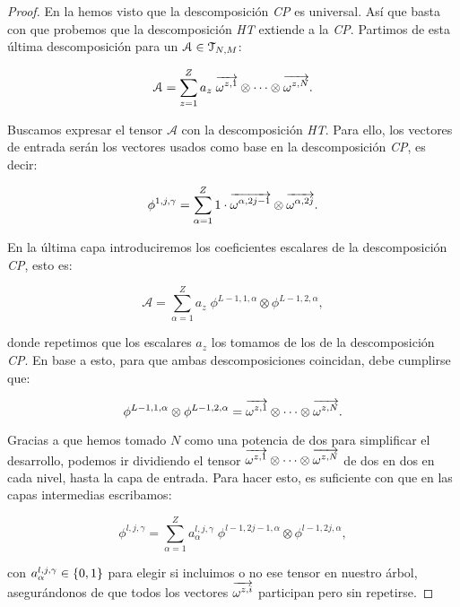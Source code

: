 \begin{proof}
    En la  hemos visto que la descomposición \textit{CP} es universal. Así que basta con que probemos que la descomposición \textit{HT} extiende a la \textit{CP}. Partimos de esta última descomposición para un $\mathcal{A} \in \mathcal{T}_{N, M}$:

    \begin{equation}
        \mathcal{A} = \sum_{z = 1}^{Z} a_z \; \overrightarrow{\omega^{z, 1}} \otimes \cdots \otimes \overrightarrow{\omega^{z, N}}.
    \end{equation}

    Buscamos expresar el tensor $\mathcal{A}$ con la descomposición \textit{HT}. Para ello, los vectores de entrada serán los vectores usados como base en la descomposición \textit{CP}, es decir:

    \begin{equation}
        \phi^{1, j, \gamma} = \sum_{\alpha = 1}^Z 1 \cdot \overrightarrow{\omega^{\alpha, 2j-1}} \otimes \overrightarrow{\omega^{\alpha, 2j}}.
    \end{equation}

    En la última capa introduciremos los coeficientes escalares de la descomposición \textit{CP}, esto es:

    \begin{equation}
        \mathcal{A} = \sum_{\alpha = 1}^Z a_z \; \phi^{L-1, 1, \alpha} \otimes \phi^{L-1, 2, \alpha},
    \end{equation}

    donde repetimos que los escalares $a_z$ los tomamos de los de la descomposición \textit{CP}. En base a esto, para que ambas descomposiciones coincidan, debe cumplirse que:

    \begin{equation}
        \phi^{L-1, 1, \alpha} \otimes \phi^{L-1, 2, \alpha} = \overrightarrow{\omega^{z,1}} \otimes \cdots \otimes \overrightarrow{\omega^{z, N}}.
    \end{equation}

    Gracias a que hemos tomado $N$ como una potencia de dos para simplificar el desarrollo, podemos ir dividiendo el tensor $\overrightarrow{\omega^{z,1}} \otimes \cdots \otimes \overrightarrow{\omega^{z, N}}$ de dos en dos en cada nivel, hasta la capa de entrada. Para hacer esto, es suficiente con que en las capas intermedias escribamos:

    \begin{equation}
        \phi^{l, j, \gamma} = \sum_{\alpha = 1}^Z a_{\alpha}^{l, j, \gamma} \; \phi^{l-1, 2j - 1, \alpha} \otimes \phi^{l-1, 2j, \alpha},
    \end{equation}

    con $a_{\alpha}^{l, j, \gamma} \in \{ 0, 1 \}$ para elegir si incluimos o no ese tensor en nuestro árbol, asegurándonos de que todos los vectores $\overrightarrow{\omega^{z, i}}$ participan pero sin repetirse.
\end{proof}


